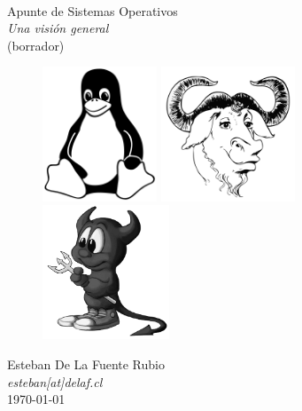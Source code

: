 %
%
%
% 

%


\begin{titlepage}
	\begin{center}
		\mbox{} \\
		\vspace{25mm}
		\Huge Apunte de Sistemas Operativos \\
		\Large \textit{Una visión general} \\
		\large (borrador) \\
		\vspace{20mm}
		\begin{figure}[h]
			\centering
			\includegraphics[height=40mm]{img/portada/linux}
			\includegraphics[height=40mm]{img/portada/gnu}
			\includegraphics[height=40mm]{img/portada/bsd}
		\end{figure}
		\vspace{20mm}
		Esteban De La Fuente Rubio \\
		\textit{esteban[at]delaf.cl} \\
		\vspace{10mm}
		\today
	\end{center}
\end{titlepage}

\newpage
\mbox{}
\thispagestyle{empty}
